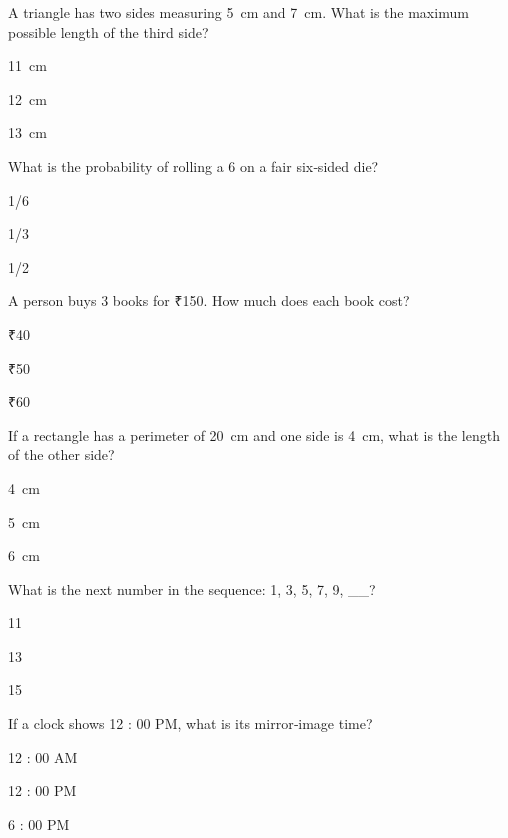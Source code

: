 
\begin{enhancedmcq}{A triangle has two sides measuring 5 cm and 7 cm. What is the maximum possible length of the third side?}
\item 11 cm
\item 12 cm
\item 13 cm

\end{enhancedmcq}
\begin{enhancedmcq}{What is the probability of rolling a 6 on a fair six‑sided die?}
\item 1/6
\item 1/3
\item 1/2

\end{enhancedmcq}
\begin{enhancedmcq}{A person buys 3 books for ₹150. How much does each book cost?}
\item ₹40
\item ₹50
\item ₹60

\end{enhancedmcq}
\begin{enhancedmcq}{If a rectangle has a perimeter of 20 cm and one side is 4 cm, what is the length of the other side?}
\item 4 cm
\item 5 cm
\item 6 cm

\end{enhancedmcq}
\begin{enhancedmcq}{What is the next number in the sequence: 1, 3, 5, 7, 9, __?}
\item 11
\item 13
\item 15

\end{enhancedmcq}
\begin{enhancedmcq}{If a clock shows 12 : 00 PM, what is its mirror‑image time?}
\item 12 : 00 AM
\item 12 : 00 PM
\item 6 : 00 PM

\end{enhancedmcq}
